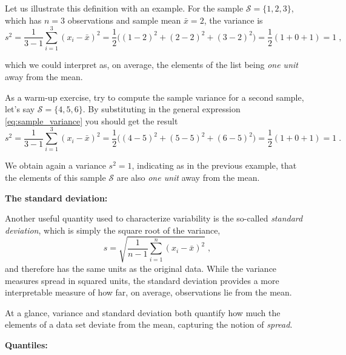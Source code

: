 \medskip

Let us illustrate this definition with an example. For the sample $\mathcal{S} = \{1, 2, 3\}$, which has $n = 3$ observations and sample mean $\bar{x} = 2$, the variance is
\begin{equation}
	s^2 = \frac{1}{3 - 1} \sum_{i = 1}^{3} (x_{i} - \bar{x})^{2} = \frac{1}{2} \big((1 - 2)^{2} + (2 - 2)^{2} + (3 - 2)^{2}\big) = \frac{1}{2} (1 + 0 + 1) = 1 \; , \nonumber
\end{equation}

which we could interpret as, on average, the elements of the list being \textit{one unit} away from the mean. 

\medskip

As a warm-up exercise, try to compute the sample variance for a second sample, let's say $\mathcal{S} = \{4, 5, 6\}$. By substituting in the general expression \eqref{eq:sample_variance} you should get the result
\begin{equation}
	s^2 = \frac{1}{3 - 1} \sum_{i = 1}^{3} (x_{i} - \bar{x})^{2} = \frac{1}{2} \big((4 - 5)^{2} + (5 - 5)^{2} + (6 - 5)^{2}\big) = \frac{1}{2} (1 + 0 + 1) = 1 \; . \nonumber
\end{equation}

We obtain again a variance $s^2 = 1$, indicating as in the previous example, that the elements of this sample $\mathcal{S}$ are also \textit{one unit} away from the mean.

\medskip

\noindent\textbf{The standard deviation:}

\medskip

Another useful quantity used to characterize variability is the so-called \textit{standard deviation}, which is simply the square root of the variance,
\begin{equation}
	s = \sqrt{\frac{1}{n - 1} \sum_{i = 1}^{n} (x_{i} - \bar{x})^{2}} \; ,
	\label{eq:sample_std}
\end{equation}
and therefore has the same units as the original data. While the variance measures spread in squared units, the standard deviation provides a more interpretable measure of how far, on average, observations lie from the mean.

At a glance, variance and standard deviation both quantify how much the elements of a data set deviate from the mean, capturing the notion of \textit{spread}.

\medskip

\noindent\textbf{Quantiles:}

